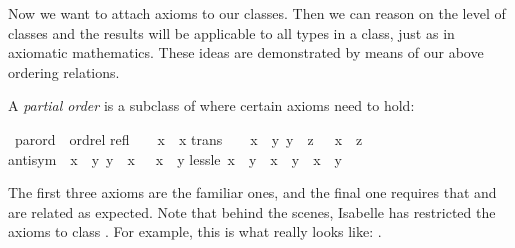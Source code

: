 %
\begin{isabellebody}%
\def\isabellecontext{Axioms}%
%
%
\begin{isamarkuptext}%
Now we want to attach axioms to our classes. Then we can reason on the
level of classes and the results will be applicable to all types in a class,
just as in axiomatic mathematics. These ideas are demonstrated by means of
our above ordering relations.%
\end{isamarkuptext}%
%
%
\begin{isamarkuptext}%
A \emph{partial order} is a subclass of 
where certain axioms need to hold:%
\end{isamarkuptext}%
\ parord\ {\isacharless}\ ordrel\isanewline
refl{\isacharcolon}\ \ \ \ {\isachardoublequote}x\ {\isacharless}{\isacharless}{\isacharequal}\ x{\isachardoublequote}\isanewline
trans{\isacharcolon}\ \ \ {\isachardoublequote}{\isasymlbrakk}\ x\ {\isacharless}{\isacharless}{\isacharequal}\ y{\isacharsemicolon}\ y\ {\isacharless}{\isacharless}{\isacharequal}\ z\ {\isasymrbrakk}\ {\isasymLongrightarrow}\ x\ {\isacharless}{\isacharless}{\isacharequal}\ z{\isachardoublequote}\isanewline
antisym{\isacharcolon}\ {\isachardoublequote}{\isasymlbrakk}\ x\ {\isacharless}{\isacharless}{\isacharequal}\ y{\isacharsemicolon}\ y\ {\isacharless}{\isacharless}{\isacharequal}\ x\ {\isasymrbrakk}\ {\isasymLongrightarrow}\ x\ {\isacharequal}\ y{\isachardoublequote}\isanewline
less{\isacharunderscore}le{\isacharcolon}\ {\isachardoublequote}x\ {\isacharless}{\isacharless}\ y\ {\isacharequal}\ {\isacharparenleft}x\ {\isacharless}{\isacharless}{\isacharequal}\ y\ {\isasymand}\ x\ {\isasymnoteq}\ y{\isacharparenright}{\isachardoublequote}%
\begin{isamarkuptext}%
\noindent
The first three axioms are the familiar ones, and the final one
requires that \isa{{\isacharless}{\isacharless}} and \isa{{\isacharless}{\isacharless}{\isacharequal}} are related as expected.
Note that behind the scenes, Isabelle has restricted the axioms to class
. For example, this is what  really looks like:
.


\end{isamarkuptext}
\end{isabellebody}
